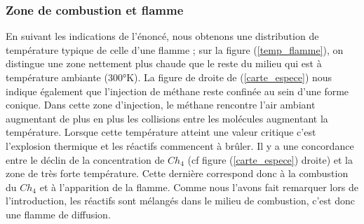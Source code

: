 \documentclass[a4paper,10pt]{article}
\newcommand{\chq}{$Ch_4$ }
\begin{document}
\subsubsection*{Zone de combustion et flamme}
En suivant les indications de l’énoncé, nous obtenons une distribution de température typique de celle d’une flamme ; sur la figure (\ref{temp_flamme}), on distingue une zone nettement plus chaude que le reste du milieu qui est à température ambiante (300°K). La figure de droite de (\ref{carte_espece}) nous indique également que l'injection de méthane reste confinée au sein d'une forme conique. Dans cette zone d'injection, le méthane rencontre l'air ambiant augmentant de plus en plus les collisions entre les molécules augmentant la température. Lorsque cette température atteint une valeur critique c'est l'explosion thermique et les réactifs commencent à brûler. Il y a une concordance entre le déclin de la concentration de \chq (cf figure (\ref{carte_espece}) droite) et la zone de très forte température. Cette dernière correspond donc à la combustion du \chq et à l'apparition de la flamme. Comme nous l'avons fait remarquer lors de l'introduction, les réactifs sont mélangés dans le milieu de combustion, c'est donc une flamme de diffusion.	\\
\end{document}
